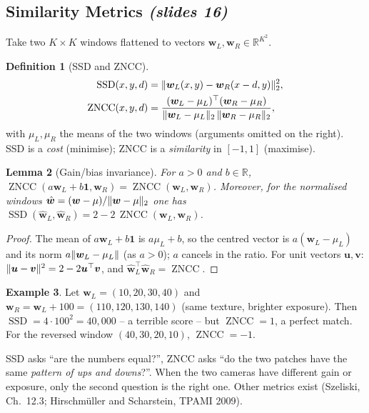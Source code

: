 \documentclass[11pt,a4paper]{article}
\newcommand{\slr}[1]{\texorpdfstring{\emph{(slides #1)}}{(slides #1)}}
\newcommand{\wL}{\bm{w}_L}
\newcommand{\wR}{\bm{w}_R}
\DeclareMathOperator{\SSD}{SSD}
\DeclareMathOperator{\ZNCC}{ZNCC}
\theoremstyle{definition}
\newtheorem{definition}{Definition}[section]
\newtheorem{example}[definition]{Example}
\theoremstyle{plain}
\newtheorem{lemma}[definition]{Lemma}
\theoremstyle{remark}
\begin{document}
\subsection{Similarity Metrics \slr{16}}
Take two $K\times K$ windows flattened to vectors $\wL,\wR\in\mathbb R^{K^2}$.
\begin{definition}[SSD and ZNCC]
\begin{align*}
\SSD(x,y,d)&=\norm{\wL(x,y)-\wR(x-d,y)}_2^2,\\
\ZNCC(x,y,d)&=\frac{(\wL-\mu_L)^{\top}(\wR-\mu_R)}{\norm{\wL-\mu_L}_2\,\norm{\wR-\mu_R}_2},
\end{align*}
with $\mu_L,\mu_R$ the means of the two windows (arguments omitted on the right). SSD is a \emph{cost} (minimise); ZNCC is a \emph{similarity} in $[-1,1]$ (maximise).
\end{definition}
\begin{lemma}[Gain/bias invariance]\label{lem:zncc}
For $a>0$ and $b\in\mathbb R$, $\ZNCC(a\wL+b\bm 1,\wR)=\ZNCC(\wL,\wR)$. Moreover, for the normalised windows $\hat{\bm w}=(\bm w-\mu)/\lVert \bm w-\mu\rVert_2$ one has $\SSD(\hat{\bm w}_L,\hat{\bm w}_R)=2-2\,\ZNCC(\wL,\wR)$.
\end{lemma}
\begin{proof}
The mean of $a\wL+b\bm1$ is $a\mu_L+b$, so the centred vector is $a(\wL-\mu_L)$ and its norm $a\norm{\wL-\mu_L}$ (as $a>0$); $a$ cancels in the ratio. For unit vectors $\bm u,\bm v$: $\lVert \bm u-\bm v\rVert^2=2-2\bm u^{\top}\bm v$, and $\hat{\bm w}_L^{\top}\hat{\bm w}_R=\ZNCC$.
\end{proof}
\begin{example}
Let $\wL=(10,20,30,40)$ and $\wR=\wL+100=(110,120,130,140)$ (same texture, brighter exposure). Then $\SSD=4\cdot100^2=40{,}000$ -- a terrible score -- but $\ZNCC=1$, a perfect match. For the reversed window $(40,30,20,10)$, $\ZNCC=-1$.
\end{example}
\begin{intuition}
SSD asks ``are the numbers equal?'', ZNCC asks ``do the two patches have the same \emph{pattern of ups and downs}?''. When the two cameras have different gain or exposure, only the second question is the right one. Other metrics exist (Szeliski, Ch.~12.3; Hirschm\"uller and Scharstein, TPAMI 2009).
\end{intuition}
\end{document}
